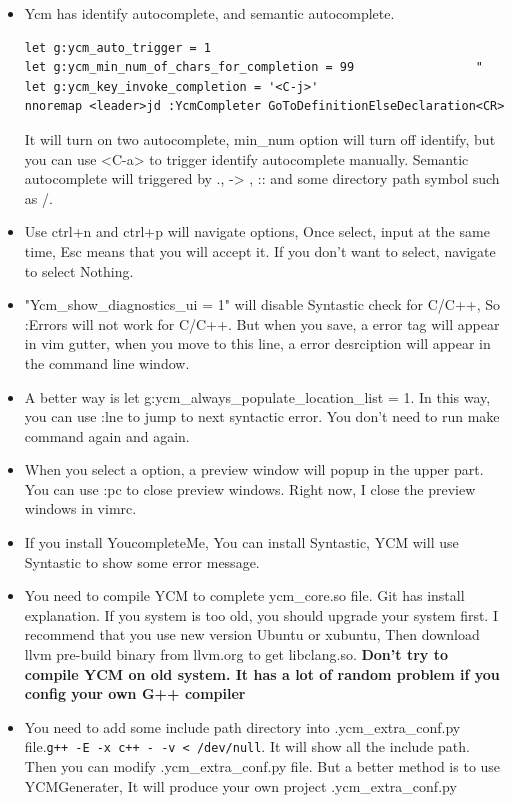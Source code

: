 \documentclass[a4paper,11pt,twoside]{book}
\begin{document}
\begin{itemize}
		\item Ycm has identify autocomplete, and semantic autocomplete. 
\begin{verbatim}
let g:ycm_auto_trigger = 1
let g:ycm_min_num_of_chars_for_completion = 99                 "
let g:ycm_key_invoke_completion = '<C-j>'
nnoremap <leader>jd :YcmCompleter GoToDefinitionElseDeclaration<CR>
\end{verbatim}
It will turn on two autocomplete, min\_num option will turn off identify, but you can use <C-a> to trigger identify autocomplete manually. Semantic autocomplete will triggered by ., -> , :: and some directory path symbol such as /. 

		\item Use ctrl+n and ctrl+p will navigate options, Once select, input at the same time, Esc means that you will accept it. If you don't want to select, navigate to select Nothing. 

		\item "Ycm\_show\_diagnostics\_ui = 1" will disable Syntastic check for C/C++, So :Errors will not work for C/C++. But when you save, a error tag will appear in vim gutter, when you move to this line, a error desrciption will appear in the command line window. 

		\item A better way is let g:ycm\_always\_populate\_location\_list = 1. In this way, you can use :lne to jump to next syntactic error. You don't need to run make command again and again.

		\item When you select a option, a preview window will popup in the upper part. You can use :pc to close preview windows. Right now, I close the preview windows in vimrc.

		\item If you install YoucompleteMe, You can install Syntastic, YCM will use Syntastic to show some error message.   

		\item You need to compile YCM to complete ycm\_core.so file. Git has install explanation. If you system is too old, you should upgrade your system first. I recommend that you use new version Ubuntu or xubuntu, Then download llvm pre-build binary from llvm.org to get libclang.so. \textbf{Don't try to compile YCM on old system. It has a lot of random problem if you config your own G++ compiler}


		\item You need to add some include path directory into .ycm\_extra\_conf.py file.\verb=g++ -E -x c++ - -v < /dev/null=. It will show all the include path. Then you can modify .ycm\_extra\_conf.py file. But a better method is to use YCMGenerater, It will produce your own project .ycm\_extra\_conf.py


\end{itemize}
\end{document}

